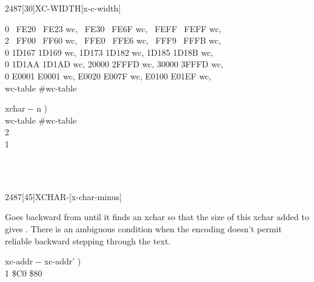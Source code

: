 \begin{worddef}{2487}[30]{XC-WIDTH}[x-c-width]
\begin{implement}
	0 ~FE20 ~FE23 wc, ~FE30 ~FE6F wc, ~FEFF ~FEFF wc,\\
	2 ~FF00 ~FF60 wc, ~FFE0 ~FFE6 wc, ~FFF9 ~FFFB wc,\\
	0 1D167 1D169 wc, 1D173 1D182 wc, 1D185 1D18B wc,\\
	0 1D1AA 1D1AD wc, 20000 2FFFD wc, 30000 3FFFD wc,\\
	0 E0001 E0001 wc, E0020 E007F wc, E0100 E01EF wc,\\
	 wc-table \word{-}  \#wc-table

	 

	\word{:}   xchar -{}- n ) \\
	\tab wc-table \#wc-table  \word{+}   \\
	\tab[2]     
		  2  \word{+}     \\
	    1 \word{;}
	\end{implement}

	\begin{testing}
		 \\
		 \\
	\end{testing}
\end{worddef}


\begin{worddef}{2487}[45]{XCHAR-}[x-char-minus]
\item {}

	Goes backward from  until it finds an xchar so that the
	size of this xchar added to  gives .
	There is an ambiguous condition when the encoding doesn't permit reliable
	backward stepping through the text.

	\begin{implement}
	\word{:}   xc-addr -{}- xc-addr' ) \\
	\tab {}  1  \word{-}   \$C0  \$80   \word{;}
	\end{implement}
\end{worddef}


